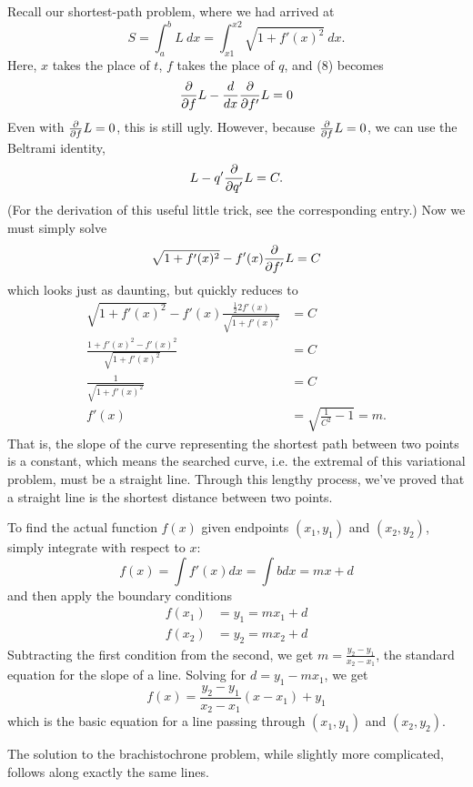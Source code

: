\documentclass{article}
\newcommand{\md}{d}
\newcommand{\mderiv}[1]{\frac{\md}{\md {#1}}} %
\newcommand{\mvar}{t}
\begin{document}
Recall our shortest-path problem, where we had arrived at
\begin{equation}
S = \int_{a}^{b} L\ dx = \int_{x1}^{x2} \sqrt{1 + f'(x)^2}\ dx.
\end{equation}
Here, $x$ takes the place of $\mvar$, $f$ takes the place of $q$, and (8) becomes
\begin{equation}
\mpderiv{f} L - \mderiv{x}{\mpderiv{f'} L} = 0
\end{equation}
Even with $\frac{\partial}{\partial {f}} L = 0$, this is still ugly.  However, because $\frac{\partial}{\partial {f}}L = 0$, we can use the Beltrami identity,
\begin{equation}
L - q' {\frac{\partial}{\partial {q'}} L} = C.
\end{equation}
(For the derivation of this useful little trick, see the corresponding entry.)  Now we must simply solve
\begin{equation}
\sqrt{1 + f'(x)^2} - f'(x) {\frac{\partial}{\partial {f'}} L} = C
\end{equation}
which looks just as daunting, but quickly reduces to
\begin{align}
\sqrt{1 + f'(x)^2} - f'(x)\frac{\frac{1}{2}2f'(x)}{\sqrt{1 + f'(x)^2}} &= C\\
\frac{1 + f'(x)^2 - f'(x)^2}{\sqrt{1 + f'(x)^2}} &= C\\
\frac{1}{\sqrt{1 + f'(x)^2}} &= C\\
f'(x) &= \sqrt{\frac{1}{C^2} - 1} = m.
\end{align}
That is, the slope of the curve representing the shortest path between two points is a constant, which means the searched curve, i.e. the extremal of this variational problem, must be a straight line.  Through this lengthy process, we've proved that a straight line is the shortest distance between two points.

To find the actual function $f(x)$ given endpoints $(x_1,y_1)$ and $(x_2,y_2)$, simply integrate with respect to $x$:
\begin{equation}
f(x) = \int f'(x) dx = \int b dx = mx + d
\end{equation}
and then apply the boundary conditions
\begin{align}
f(x_1) &= y_1 = mx_1 + d\\
f(x_2) &= y_2 = mx_2 + d
\end{align}
Subtracting the first condition from the second, we get $m = \frac{y_2 - y_1}{x_2 - x_1}$, the standard equation for the slope of a line.  Solving for $d = y_1 - mx_1$, we get
\begin{equation}
f(x) = \frac{y_2 - y_1}{x_2 - x_1}(x - x_1) + y_1
\end{equation}
which is the basic equation for a line passing through $(x_1,y_1)$ and $(x_2,y_2)$.

The solution to the brachistochrone problem, while slightly more complicated, follows along exactly the same lines.
\end{document}
